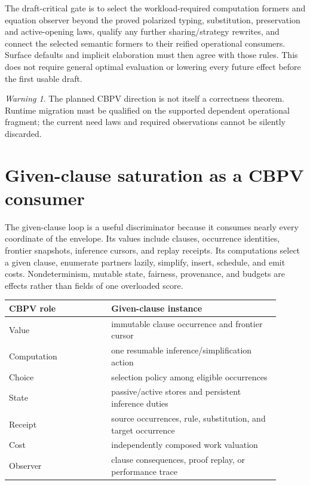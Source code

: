 \documentclass[11pt]{article}
\theoremstyle{definition}
\theoremstyle{remark}
\newtheorem{warning}[theorem]{Warning}
\begin{document}
The draft-critical gate is to select the workload-required computation
formers and equation observer beyond the proved polarized typing,
substitution, preservation and active-opening laws, qualify any further
sharing/strategy rewrites, and connect the selected semantic formers to
their reified operational consumers. Surface defaults and implicit elaboration must
then agree with those rules. This does not require general optimal evaluation
or lowering every future effect before the first usable draft.

\begin{warning}
The planned CBPV direction is not itself a correctness theorem. Runtime
migration must be qualified on the supported dependent operational fragment;
the current need laws and required observations cannot be silently discarded.
\end{warning}

\section{Given-clause saturation as a CBPV consumer}

The given-clause loop is a useful discriminator because it consumes nearly every
coordinate of the envelope.  Its values include clauses, occurrence identities,
frontier snapshots, inference cursors, and replay receipts.  Its computations
select a given clause, enumerate partners lazily, simplify, insert, schedule, and
emit costs.  Nondeterminism, mutable state, fairness, provenance, and budgets are
effects rather than fields of one overloaded score.

\begin{center}
\begin{tabular}{p{0.34\linewidth}p{0.56\linewidth}}
\toprule
CBPV role & Given-clause instance \\
\midrule
Value & immutable clause occurrence and frontier cursor \\
Computation & one resumable inference/simplification action \\
Choice & selection policy among eligible occurrences \\
State & passive/active stores and persistent inference duties \\
Receipt & source occurrences, rule, substitution, and target occurrence \\
Cost & independently composed work valuation \\
Observer & clause consequences, proof replay, or performance trace \\
\bottomrule
\end{tabular}
\end{center}
\end{document}
